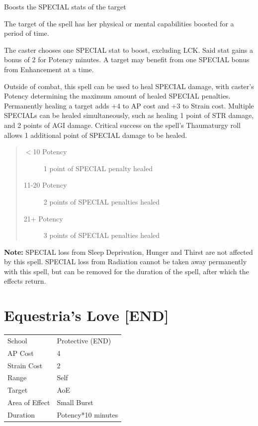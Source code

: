 \documentclass[11pt,a4paper,twocolumn]{book}
\begin{document}
\medskip

Boosts the SPECIAL stats of the target

The target of the spell has her physical or mental capabilities boosted for a period of time.

The caster chooses one SPECIAL stat to boost, excluding LCK. Said stat gains a bonus of 2 for Potency minutes. A target may benefit from one SPECIAL bonus from Enhancement at a time.

Outside of combat, this spell can be used to heal SPECIAL damage, with caster's Potency determining the maximum amount of healed SPECIAL penalties. Permanently healing a target adds +4 to AP cost and +3 to Strain cost. Multiple SPECIALs can be healed simultaneously, such as healing 1 point of STR damage, and 2 points of AGI damage. Critical success on the spell's Thaumaturgy roll allows 1 additional point of SPECIAL damage to be healed.

\begin{quote}
  \begin{description}
    \item[$<$10 Potency] 	1 point of SPECIAL penalty healed
    \item[11-20 Potency] 	2 points of SPECIAL penalties healed
    \item[21+ Potency] 		3 points of SPECIAL penalties healed
  \end{description}	
\end{quote}

\textbf{Note:} SPECIAL loss from Sleep Deprivation, Hunger and Thirst are not affected by this spell. SPECIAL loss from Radiation cannot be taken away permanently with this spell, but can be removed for the duration of the spell, after which the effects return.


\section*{Equestria's Love [END]}
{
	\begin{tabu} to 75mm{| X[l,4] | X[l,7] |}
		\hline
		School 			& Protective (END) 		\\
        AP Cost	      	& 4 					\\
        Strain Cost     & 2 					\\
        Range     		& Self					\\
        Target      	& AoE					\\
        Area of Effect  & Small Burst			\\
        Duration     	& Potency*10 minutes 	\\ \hline
	\end{tabu}
		
}
\end{document}
